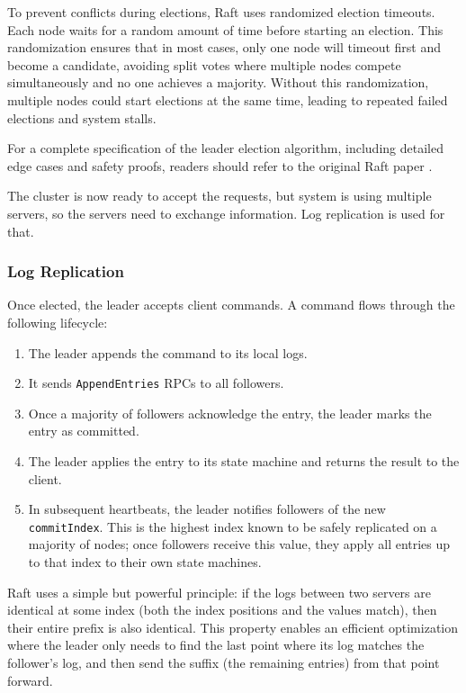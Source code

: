 \documentclass[shortabstract]{iithesis}
\begin{document}
To prevent conflicts during elections, Raft uses randomized election timeouts. Each node waits for a random amount of time before starting an election. This randomization ensures that in most cases, only one node will timeout first and become a candidate, avoiding split votes where multiple nodes compete simultaneously and no one achieves a majority. Without this randomization, multiple nodes could start elections at the same time, leading to repeated failed elections and system stalls. 

For a complete specification of the leader election algorithm, including detailed edge cases and safety proofs, readers should refer to the original Raft paper \cite{raft}.

The cluster is now ready to accept the requests, but system is using multiple servers, so the servers need to exchange information. Log replication is used for that.

\subsubsection{Log Replication}
Once elected, the leader accepts client commands. A command flows through the following lifecycle:
\begin{enumerate}
    \item The leader appends the command to its local logs.
    \item It sends \texttt{AppendEntries} RPCs to all followers.
    \item Once a majority of followers acknowledge the entry, the leader marks the entry as committed.
    \item The leader applies the entry to its state machine and returns the result to the client.
    \item In subsequent heartbeats, the leader notifies followers of the new \texttt{commitIndex}. This is the highest index known to be safely replicated on a majority of nodes; once followers receive this value, they apply all entries up to that index to their own state machines.
\end{enumerate}

Raft uses a simple but powerful principle: if the logs between two servers are identical at some index (both the index positions and the values match), then their entire prefix is also identical. This property enables an efficient optimization where the leader only needs to find the last point where its log matches the follower's log, and then send the suffix (the remaining entries) from that point forward. 
\end{document}
